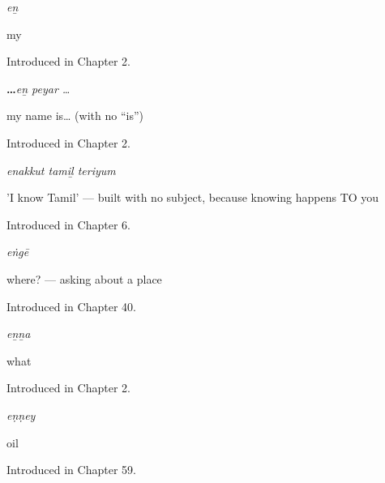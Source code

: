 \noindent\begin{minipage}[t]{\linewidth}
\raggedright
\textbf{}\enspace\emph{eṉ}\par
\small my\par
\footnotesize Introduced in Chapter 2.
\end{minipage}\par\medskip

\noindent\begin{minipage}[t]{\linewidth}
\raggedright
\textbf{  …}\enspace\emph{eṉ peyar …}\par
\small my name is… (with no \textquotedblleft{}is\textquotedblright{})\par
\footnotesize Introduced in Chapter 2.
\end{minipage}\par\medskip

\noindent\begin{minipage}[t]{\linewidth}
\raggedright
\textbf{  }\enspace\emph{enakkut tamiḻ teriyum}\par
\small 'I know Tamil' — built with no subject, because knowing happens TO you\par
\footnotesize Introduced in Chapter 6.
\end{minipage}\par\medskip

\noindent\begin{minipage}[t]{\linewidth}
\raggedright
\textbf{}\enspace\emph{eṅgē}\par
\small where? — asking about a place\par
\footnotesize Introduced in Chapter 40.
\end{minipage}\par\medskip

\noindent\begin{minipage}[t]{\linewidth}
\raggedright
\textbf{}\enspace\emph{eṉṉa}\par
\small what\par
\footnotesize Introduced in Chapter 2.
\end{minipage}\par\medskip

\noindent\begin{minipage}[t]{\linewidth}
\raggedright
\textbf{}\enspace\emph{eṇṇey}\par
\small oil\par
\footnotesize Introduced in Chapter 59.
\end{minipage}\par\medskip

